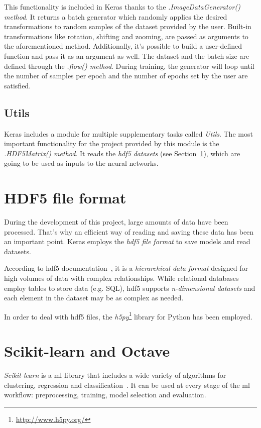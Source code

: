 This functionality is included in Keras thanks to the \emph{\textit{.ImageDataGenerator()} method}. It returns a batch generator which randomly applies the desired transformations to random samples of the dataset provided by the user. Built-in transformations like rotation, shifting and zooming, are passed as arguments to the aforementioned method. Additionally, it's possible to build a user-defined function and pass it as an argument as well. The dataset and the batch size are defined through the \emph{\textit{.flow()} method}. During training, the generator will loop until the number of samples per epoch and the number of epochs set by the user are satisfied.

\subsection{Utils}
Keras includes a module for multiple supplementary tasks called \emph{\textit{Utils}}. The most important functionality for the project provided by this module is the \emph{\textit{.HDF5Matrix()} method}. It reads the \emph{\gls{hdf5} datasets} (see Section~\ref{sec:hdf}), which are going to be used as inputs to the neural networks.

\section{HDF5 file format}\label{sec:hdf}
During the development of this project, large amounts of data have been processed. That's why an efficient way of reading and saving these data has been an important point. Keras employs the \emph{\gls{hdf5} file format} to save models and read datasets.

According to \gls{hdf5} documentation~\cite{hdf5}, it is a \emph{hierarchical data format} designed for high volumes of data with complex relationships. While relational databases employ tables to store data (e.g. SQL), \gls{hdf5} supports \emph{n-dimensional datasets} and each element in the dataset may be as complex as needed.

In order to deal with \gls{hdf5} files, the \emph{h5py}\footnote{\url{http://www.h5py.org/}} library for Python has been employed.

\section{Scikit-learn and Octave}\label{sec:skoctave}
\emph{Scikit-learn} is a \gls{ml} library that includes a wide variety of algorithms for clustering, regression and classification~\cite{scikit-learn}. It can be used at every stage of the \gls{ml} workflow: preprocessing, training, model selection and evaluation.

